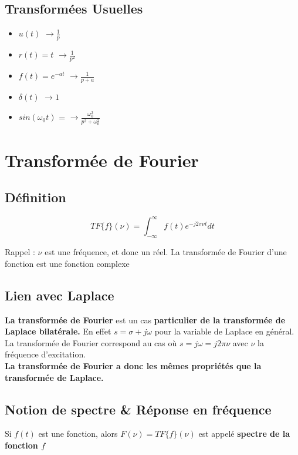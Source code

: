 \documentclass[11pt,a4paper]{article}
\begin{document}
\subsection{Transformées Usuelles}
\begin{itemize}
\item $u(t)$  $\rightarrow \frac{\displaystyle 1}{\displaystyle p} $
\item $r(t) = t$  $\rightarrow \frac{\displaystyle 1}{ \displaystyle p^2} $
\item $f(t) = e^{-at}$ $\rightarrow \frac{\displaystyle 1}{\displaystyle p+a} $
\item $\delta (t)$ $\rightarrow 1$ 
\item $sin(\omega_0 t)$ = $\rightarrow \frac{\displaystyle \omega_0^2}{ \displaystyle p^2 + \omega_0^2} $
\end{itemize}
\vspace{1cm}
\section{Transformée de Fourier}
\subsection{Définition}
\[TF\{ f \}(\nu) = \displaystyle \int^{\infty}_{-\infty} f(t) e^{-j2\pi \nu t} dt\]

Rappel :  $\nu$ est une fréquence, et donc un réel. La transformée de Fourier d'une fonction est une fonction complexe
\\
\subsection{Lien avec Laplace}
\textbf{La transformée de Fourier} est un cas \textbf{particulier de la transformée de Laplace bilatérale.} En effet $s= \sigma + j \omega$ pour la variable de Laplace en général. La transformée de Fourier correspond au cas où $s = j \omega = j 2 \pi \nu$ avec $\nu$ la fréquence d'excitation.\\

\textbf{La transformée de Fourier a donc les mêmes propriétés que la transformée de Laplace.}
\\
\subsection{Notion de spectre \& Réponse en fréquence}
Si $f(t)$ est une fonction, alors $F(\nu) = TF\{f\}(\nu)$ est appelé \textbf{spectre de la fonction $f$}\\
\end{document}
